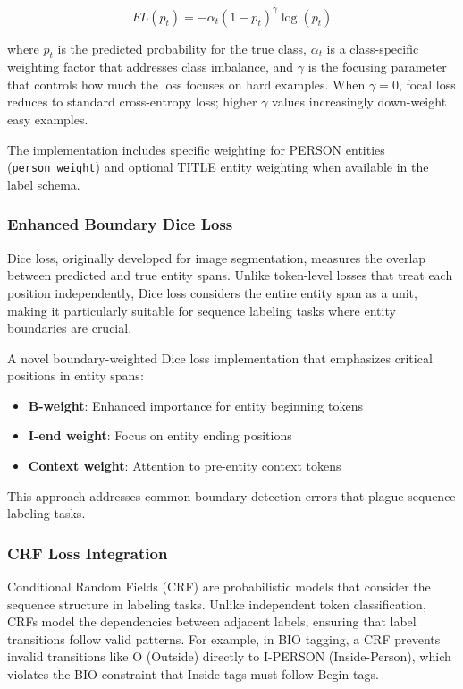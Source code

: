 \documentclass[a4paper]{usiinfbachelorproject}
\begin{document}
\begin{equation}
    FL(p_t) = -\alpha_t(1-p_t)^\gamma \log(p_t)
\end{equation}

where $p_t$ is the predicted probability for the true class, $\alpha_t$ is a class-specific weighting factor that addresses class imbalance, and $\gamma$ is the focusing parameter that controls how much the loss focuses on hard examples. When $\gamma = 0$, focal loss reduces to standard cross-entropy loss; higher $\gamma$ values increasingly down-weight easy examples.

The implementation includes specific weighting for PERSON entities (\texttt{person\_weight}) and optional TITLE entity weighting when available in the label schema.

\subsubsection{Enhanced Boundary Dice Loss}

Dice loss, originally developed for image segmentation, measures the overlap between predicted and true entity spans. Unlike token-level losses that treat each position independently, Dice loss considers the entire entity span as a unit, making it particularly suitable for sequence labeling tasks where entity boundaries are crucial.

A novel boundary-weighted Dice loss implementation that emphasizes critical positions in entity spans:

\begin{itemize}
    \item \textbf{B-weight}: Enhanced importance for entity beginning tokens
    \item \textbf{I-end weight}: Focus on entity ending positions
    \item \textbf{Context weight}: Attention to pre-entity context tokens
\end{itemize}

This approach addresses common boundary detection errors that plague sequence labeling tasks.

\subsubsection{CRF Loss Integration}

Conditional Random Fields (CRF) are probabilistic models that consider the sequence structure in labeling tasks. Unlike independent token classification, CRFs model the dependencies between adjacent labels, ensuring that label transitions follow valid patterns. For example, in BIO tagging, a CRF prevents invalid transitions like O (Outside) directly to I-PERSON (Inside-Person), which violates the BIO constraint that Inside tags must follow Begin tags.
\end{document}
